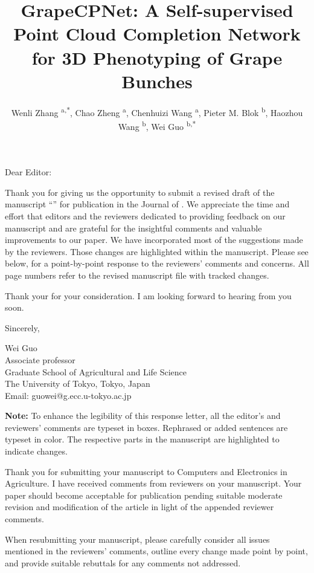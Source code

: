 \documentclass{ar2rc}
\title{GrapeCPNet: A Self-supervised Point Cloud Completion Network for 3D Phenotyping of Grape Bunches}
\author{
    Wenli Zhang \textsuperscript{a,*},
    Chao Zheng \textsuperscript{a},
    Chenhuizi Wang \textsuperscript{a},
    Pieter M. Blok \textsuperscript{b},
    Haozhou Wang \textsuperscript{b},
    Wei Guo \textsuperscript{b,*}
}
\begin{document}
\begin{center}
    \maketitle
\end{center}

\thedate

Dear Editor:

Thank you for giving us the opportunity to submit a revised draft of the manuscript ``\thetitle'' for publication in the Journal of \thejournal. We appreciate the time and effort that editors and the reviewers dedicated to providing feedback on our manuscript and are grateful for the insightful comments and valuable improvements to our paper. We have incorporated most of the suggestions made by the reviewers. Those changes are highlighted within the manuscript. Please see below, for a point-by-point response to the reviewers' comments and concerns. All page numbers refer to the revised manuscript file with tracked changes.

Thank your for your consideration. I am looking forward to hearing from you soon.

Sincerely,

Wei Guo\\
Associate professor\\
Graduate School of Agricultural and Life Science\\
The University of Tokyo, Tokyo, Japan\\
Email: guowei@g.ecc.u-tokyo.ac.jp

\vfill
\textbf{Note:} To enhance the legibility of this response letter, all the editor's and reviewers' comments are typeset in boxes. Rephrased or added sentences are typeset in color. The respective parts in the manuscript are highlighted to indicate changes.

\editor

\begin{reviewercomment}
    Thank you for submitting your manuscript to Computers and Electronics in Agriculture. 
    I have received comments from reviewers on your manuscript. 
    Your paper should become acceptable for publication pending suitable moderate revision and modification of the article in light of the appended reviewer comments.

    When resubmitting your manuscript, please carefully consider all issues mentioned in the reviewers' comments, outline every change made point by point, and provide suitable rebuttals for any comments not addressed.
\end{reviewercomment}
\end{document}
